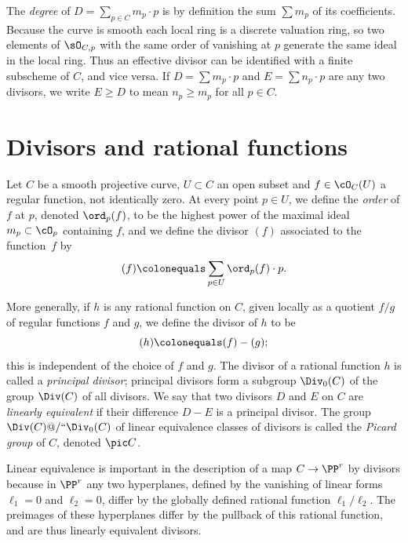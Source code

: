 The \emph{degree} of  $D = \sum_{p\in C} m_p\cdot p$ is by definition
%
the sum $\sum m_p$ of its coefficients. Because the curve is smooth
each local ring is a discrete valuation ring, so two elements of
$\sO_{C,p}$ with the same order of vanishing at $p$ generate the same ideal in the local ring. Thus an effective divisor
can be identified with a finite subscheme of $C$, and vice versa. If $D = \sum m_p\cdot p$ and $E = \sum n_p\cdot p$ are any two divisors, we write $E \geq D$ to mean $n_p \geq m_p$ for all $p \in C$.


\section{Divisors and rational functions}

Let $C$ be a smooth projective curve, $U \subset C$ an open subset and
$f \in \cO_C(U)$ a regular function, not identically zero. At every
point $p \in U$, we define the \emph{order} of $f$ at $p$, denoted
%
%
$\ord_p(f)$,
to be the highest power of the maximal ideal $m_p \subset
\cO_p$ containing $f$, and we define the divisor $(f)$ associated to
%
the function~$f$ by
$$
(f) \colonequals \sum_{p \in U} \ord_p(f) \cdot p.
$$

More generally, if $h$ is any rational function on $C$, given locally as a quotient $f/g$ of regular functions $f$ and $g$, we define the divisor of $h$ to be
$$
(h) \colonequals (f) - (g);
$$
%
this is independent of the choice of $f$ and $g$. The divisor of a
%
rational function $h$ is called a \emph{principal divisor}; principal
divisors form a subgroup $\Div_0(C)$ of the group $\Div(C)$ of all
divisors. We say that two divisors $D$ and $E$ on $C$ are
\emph{linearly equivalent} if their difference $D-E$ is a principal
divisor. The group $\Div(C)@/` `\Div_0(C)$ of linear equivalence classes
%
of divisors is called the \emph{Picard group} of $C$, denoted
%
$\pic C$.

Linear equivalence
%
is important in the description of a map $C\to \PP^{r}$ by divisors
because in $\PP^{r}$ any two hyperplanes, defined by the vanishing of linear forms  $\ell_{1}=0$ and $\ell_{2}=0$, differ by the globally defined rational
function $\ell_{1}/\ell_{2}$. The preimages of these hyperplanes
differ by the
pullback of this rational function,
and are thus linearly equivalent divisors.

